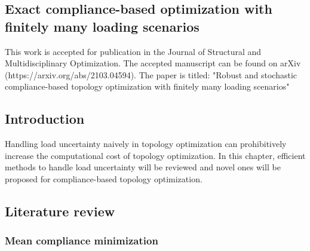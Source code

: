 \begin{titlepage}\centering
\vspace*{\fill}

\chapter{Exact compliance-based optimization with finitely many loading scenarios}\thispagestyle{EmptyHeader}
\label{chp:3}

\begin{tcolorbox}
This work is accepted for publication in the Journal of Structural and Multidisciplinary Optimization. The accepted manuscript can be found on arXiv (https://arxiv.org/abs/2103.04594). The paper is titled: "Robust and stochastic compliance-based topology optimization with finitely many loading scenarios"  \citep{tarek2021robust}
\end{tcolorbox}

\vspace*{\fill}
\end{titlepage}

\newpage

\section{Introduction}

Handling load uncertainty naively in topology optimization can prohibitively increase the computational cost of topology optimization. In this chapter, efficient methods to handle load uncertainty will be reviewed and novel ones will be proposed for compliance-based topology optimization.

\section{Literature review}

  \subsection{Mean compliance minimization}

